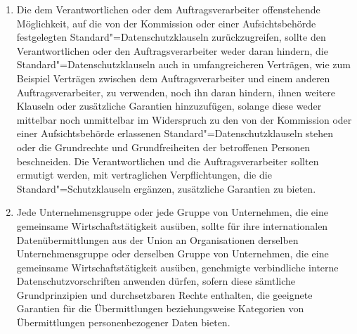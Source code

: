 \begin{enumerate}

   \item Die dem Verantwortlichen oder dem Auftragsverarbeiter offenstehende Möglichkeit, auf die von der Kommission
    oder einer Aufsichtsbehörde festgelegten Standard"=Datenschutzklauseln zurückzugreifen, sollte den Verantwortlichen
    oder den Auftragsverarbeiter weder daran hindern, die Standard"=Datenschutzklauseln auch in umfangreicheren
    Verträgen, wie zum Beispiel Verträgen zwischen dem Auftragsverarbeiter und einem anderen Auftragsverarbeiter, zu
    verwenden, noch ihn daran hindern, ihnen weitere Klauseln oder zusätzliche Garantien hinzuzufügen, solange diese
    weder mittelbar noch unmittelbar im Widerspruch zu den von der Kommission oder einer Aufsichtsbehörde erlassenen
    Standard"=Datenschutzklauseln stehen oder die Grundrechte und Grundfreiheiten der betroffenen Personen beschneiden.
    Die Verantwortlichen und die Auftragsverarbeiter sollten ermutigt werden, mit vertraglichen Verpflichtungen, die
    die Standard"=Schutzklauseln ergänzen, zusätzliche Garantien zu bieten.%
   \label{eg:109}
   

   \item Jede Unternehmensgruppe oder jede Gruppe von Unternehmen, die eine gemeinsame Wirtschaftstätigkeit ausüben,
    sollte für ihre internationalen Datenübermittlungen aus der Union an Organisationen derselben Unternehmensgruppe
    oder derselben Gruppe von Unternehmen, die eine gemeinsame Wirtschaftstätigkeit ausüben, genehmigte verbindliche
    interne Datenschutzvorschriften anwenden dürfen, sofern diese sämtliche Grundprinzipien und durchsetzbaren Rechte
    enthalten, die geeignete Garantien für die Übermittlungen beziehungsweise Kategorien von Übermittlungen
    personenbezogener Daten bieten.%
   \label{eg:110}
   


\end{enumerate}
